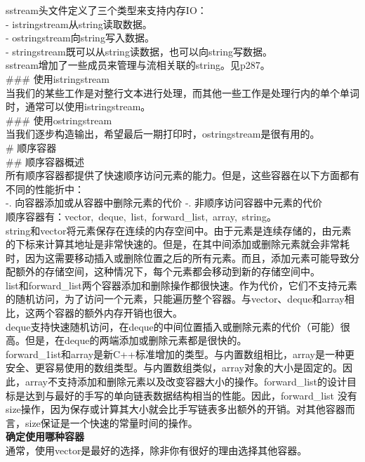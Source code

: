 \documentclass[
  a4paper,
  oneside,tablecaptionabove
]{scrbook}
\begin{document}
sstream头文件定义了三个类型来支持内存IO：\\
- istringstream从string读取数据。\\
- ostringstream向string写入数据。\\
- stringstream既可以从string读数据，也可以向string写数据。\\
sstream增加了一些成员来管理与流相关联的string。见p287。\\
\#\#\# 使用istringstream\\
当我们的某些工作是对整行文本进行处理，而其他一些工作是处理行内的单个单词时，通常可以使用istringstream。\\
\#\#\# 使用ostringstream\\
当我们逐步构造输出，希望最后一期打印时，ostringstream是很有用的。\\
\# 顺序容器\\
\#\# 顺序容器概述\\
所有顺序容器都提供了快速顺序访问元素的能力。但是，这些容器在以下方面都有不同的性能折中：\\
-. 向容器添加或从容器中删除元素的代价 -. 非顺序访问容器中元素的代价\\
顺序容器有：vector,~deque,~list,~forward\_list,~array,~string。\\
string和vector将元素保存在连续的内存空间中。由于元素是连续存储的，由元素的下标来计算其地址是非常快速的。但是，在其中间添加或删除元素就会非常耗时，因为这需要移动插入或删除位置之后的所有元素。而且，添加元素可能导致分配额外的存储空间，这种情况下，每个元素都会移动到新的存储空间中。\\
list和forward\_list两个容器添加和删除操作都很快速。作为代价，它们不支持元素的随机访问，为了访问一个元素，只能遍历整个容器。与vector、deque和array相比，这两个容器的额外内存开销也很大。\\
deque支持快速随机访问，在deque的中间位置插入或删除元素的代价（可能）很高。但是，在deque的两端添加或删除元素都是很快的。\\
forward\_1ist和array是新C++标准增加的类型。与内置数组相比，array是一种更安全、更容易使用的数组类型。与内置数组类似，array对象的大小是固定的。因此，array不支持添加和删除元素以及改变容器大小的操作。forward\_list的设计目标是达到与最好的手写的单向链表数据结构相当的性能。因此，forward\_list
没有size操作，因为保存或计算其大小就会比手写链表多出额外的开销。对其他容器而言，size保证是一个快速的常量时间的操作。\\
\textbf{确定使用哪种容器}\\
通常，使用vector是最好的选择，除非你有很好的理由选择其他容器。\\
\end{document}
